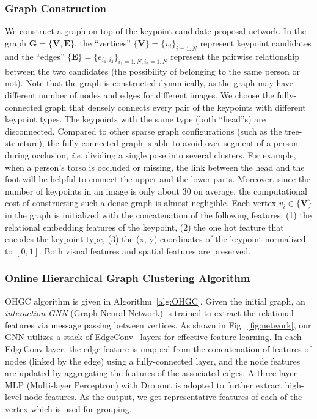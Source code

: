 \documentclass[runningheads]{llncs}
\newcommand{\ie}{\textit{i}.\textit{e}. }
\begin{document}
	\subsubsection{Graph Construction}
	We construct a graph on top of the keypoint candidate proposal network. In the graph  $\mathbf{G} = \{\mathbf{V}, \mathbf{E}\}$, the ``vertices'' $\mathbf{\{V\}} = \{v_{i}\}_{i=1:N}$ represent keypoint candidates and the ``edges'' $\mathbf{\{E\}} = \{e_{i_1,i_2}\}_{i_1=1:N, i_2=1:N}$ represent the pairwise relationship between the two candidates (the possibility of belonging to the same person or not). Note that the graph is constructed dynamically, as the graph may have different number of nodes and edges for different images. We choose the fully-connected graph that densely connects every pair of the keypoints with different keypoint types. The keypoints with the same type (both ``head''s) are disconnected. Compared to other sparse graph configurations (such as the tree-structure), the fully-connected graph is able to avoid over-segment of a person during occlusion, \ie dividing a single pose into several clusters. For example, when a person's torso is occluded or missing, the link between the head and the foot will be helpful to connect the upper and the lower parts. Moreover, since the number of keypoints in an image is only about 30 on average, the computational cost of constructing such a dense graph is almost negligible. Each vertex $v_i \in \mathbf{\{V\}}$ in the graph is initialized with the concatenation of the following features: (1) the relational embedding features of the keypoint, (2) the one hot feature that encodes the keypoint type, (3) the (x, y) coordinates of the keypoint normalized to $[0, 1]$. Both visual features and spatial features are preserved.
	
	\subsubsection{Online Hierarchical Graph Clustering Algorithm}
	OHGC algorithm is given in Algorithm~\ref{alg:OHGC}. Given the initial graph, an \emph{interaction GNN} (Graph Neural Network) is trained to extract the relational features via message passing between vertices. As shown in Fig.~\ref{fig:network}, our GNN utilizes a stack of EdgeConv~\cite{wang2019dynamic} layers for effective feature learning. In each EdgeConv layer, the edge feature is mapped from the concatenation of features of nodes (linked by the edge) using a fully-connected layer, and the node features are updated by aggregating the features of the associated edges. A three-layer MLP (Multi-layer Perceptron) with Dropout is adopted to further extract high-level node features. As the output, we get representative features of each of the vertex which is used for grouping.
	
\end{document}
